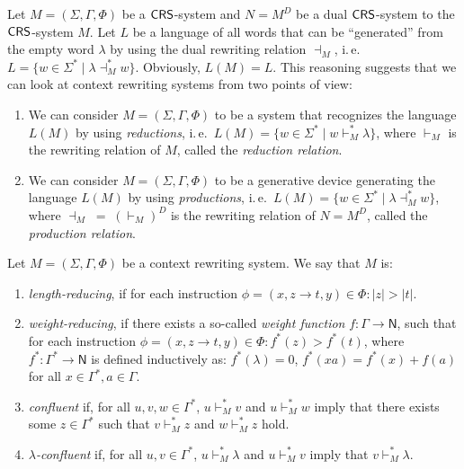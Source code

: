 \begin{remark}\label{remark:approach}
Let $M=(\Sigma, \Gamma, \Phi)$ be a $\textup{\sf CRS\/}$-system and $N = M^D$ be a dual $\textup{\sf CRS\/}$-system to the $\textup{\sf CRS\/}$-system $M$. Let $L$ be a language of all words that can be ``generated'' from the empty word $\lambda$ by using the dual rewriting relation $\dashv_M$, i.\,e.\ $L = \{w \in \Sigma^* \mid \lambda \dashv_M^* w\}$. Obviously, $L(M) = L$. This reasoning suggests that we can look at context rewriting systems from two points of view:
\begin{enumerate}
\item
We can consider $M=(\Sigma, \Gamma, \Phi)$ to be a system that recognizes the language $L(M)$ by using \emph{reductions}, i.\,e.\ $L(M) = \{ w \in \Sigma^* \mid w \vdash^*_M \lambda \}$, where $\vdash_M$ is the rewriting relation of $M$, called the \emph{reduction relation}.
\item
We can consider $M=(\Sigma, \Gamma, \Phi)$ to be a generative device generating the language $L(M)$ by using \emph{productions}, i.\,e.\ $L(M) = \{ w \in \Sigma^* \mid \lambda \dashv^*_M w \}$, where $\dashv_M \;= \; (\vdash_M)^D$ is the rewriting relation of $N = M^D$, called the \emph{production relation}.
\end{enumerate}
\end{remark}

\begin{definition}\label{definition:crs-types}
Let  $M = (\Sigma, \Gamma, \Phi)$ be a context rewriting system. We say that $M$ is:
\begin{enumerate}
\item {}\emph{length-reducing}, if for each instruction $\phi = (x, z \to t, y) \in \Phi: |z| > |t|$.
\item {}\emph{weight-reducing}, if there exists a so-called \emph{weight function} $f: \Gamma \to \mathsf{N}$, such that for each instruction $\phi = (x, z \to t, y) \in \Phi: f^*(z) > f^*(t)$, where $f^*: \Gamma^* \to \mathsf{N}$ is defined inductively as: $f^*(\lambda) = 0$, $f^*(xa) = f^*(x) + f(a)$ for all $x \in \Gamma^*, a \in \Gamma$.
\item {}\emph{confluent} if, for all $u, v, w \in \Gamma^*$, $u \vdash_M^* v$ and $u \vdash_M^* w$ imply that there exists some $z \in \Gamma^*$ such that $v \vdash_M^* z$ and $w \vdash_M^* z$ hold.
\item {}\emph{$\lambda$-confluent} if, for all $u, v \in \Gamma^*$, $u \vdash_M^* \lambda$ and $u \vdash_M^* v$ imply that $v \vdash_M^* \lambda$.
\end{enumerate}
\end{definition}

